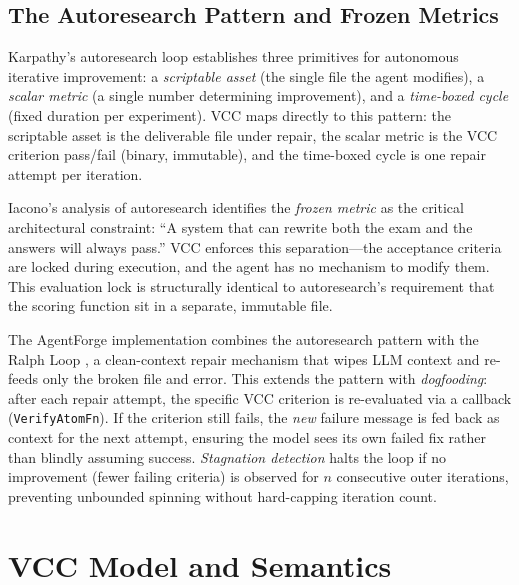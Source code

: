 \documentclass[11pt]{article}
\begin{document}
\subsection{The Autoresearch Pattern and Frozen Metrics}
Karpathy's autoresearch loop \cite{karpathy_autoresearch} establishes three primitives for autonomous iterative improvement: a \emph{scriptable asset} (the single file the agent modifies), a \emph{scalar metric} (a single number determining improvement), and a \emph{time-boxed cycle} (fixed duration per experiment). VCC maps directly to this pattern: the scriptable asset is the deliverable file under repair, the scalar metric is the VCC criterion pass/fail (binary, immutable), and the time-boxed cycle is one repair attempt per iteration.

Iacono's analysis of autoresearch \cite{karpathy_autoresearch} identifies the \emph{frozen metric} as the critical architectural constraint: ``A system that can rewrite both the exam and the answers will always pass.'' VCC enforces this separation---the acceptance criteria are locked during execution, and the agent has no mechanism to modify them. This evaluation lock is structurally identical to autoresearch's requirement that the scoring function sit in a separate, immutable file.

The AgentForge implementation combines the autoresearch pattern with the Ralph Loop \cite{ghuntley_ralph_loop}, a clean-context repair mechanism that wipes LLM context and re-feeds only the broken file and error. This extends the pattern with \emph{dogfooding}: after each repair attempt, the specific VCC criterion is re-evaluated via a callback (\texttt{VerifyAtomFn}). If the criterion still fails, the \emph{new} failure message is fed back as context for the next attempt, ensuring the model sees its own failed fix rather than blindly assuming success. \emph{Stagnation detection} halts the loop if no improvement (fewer failing criteria) is observed for $n$ consecutive outer iterations, preventing unbounded spinning without hard-capping iteration count.

\section{VCC Model and Semantics}
\end{document}
